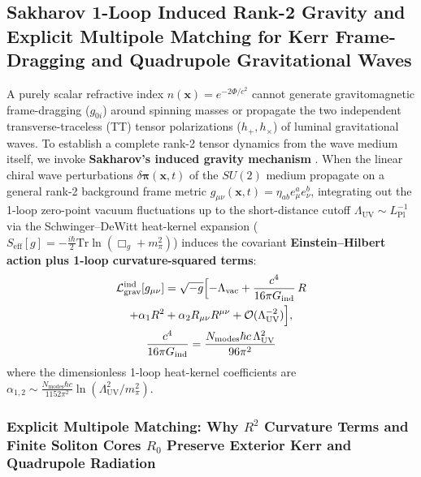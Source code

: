 \documentclass[10pt,aps,prd,twocolumn,superscriptaddress,nofootinbib,floatfix,longbibliography,showkeys]{revtex4-2}
\begin{document}
\subsection{Sakharov 1-Loop Induced Rank-2 Gravity and Explicit Multipole Matching for Kerr Frame-Dragging and Quadrupole Gravitational Waves}\label{sec:5.3}

A purely scalar refractive index $n(\mathbf{x}) = e^{-2\Phi/c^2}$ cannot generate gravitomagnetic frame-dragging ($g_{0i}$) around spinning masses or propagate the two independent transverse-traceless (TT) tensor polarizations ($h_+, h_\times$) of luminal gravitational waves. To establish a complete rank-2 tensor dynamics from the wave medium itself, we invoke \textbf{Sakharov's induced gravity mechanism} \cite{ref13,ref15,ref16}. When the linear chiral wave perturbations $\delta\boldsymbol{\pi}(\mathbf{x}, t)$ of the $SU(2)$ medium propagate on a general rank-2 background frame metric $g_{\mu\nu}(\mathbf{x}, t) = \eta_{ab} e^a_\mu e^b_\nu$, integrating out the 1-loop zero-point vacuum fluctuations up to the short-distance cutoff $\Lambda_{\text{UV}} \sim L_{\text{Pl}}^{-1}$ via the Schwinger--DeWitt heat-kernel expansion ($S_{\text{eff}}[g] = -\frac{i\hbar}{2}\text{Tr}\ln(\Box_g + m_\pi^2)$) induces the covariant \textbf{Einstein--Hilbert action plus 1-loop curvature-squared terms}:
\begin{equation}\begin{gathered}
\mathcal{L}_{\text{grav}}^{\text{ind}}[g_{\mu\nu}] = \sqrt{-g}\Bigl[ -\Lambda_{\text{vac}} + \frac{c^4}{16\pi G_{\text{ind}}}\,R \\
+ \alpha_1 R^2 + \alpha_2 R_{\mu\nu}R^{\mu\nu} + \mathcal{O}(\Lambda_{\text{UV}}^{-2}) \Bigr], \\
\frac{c^4}{16\pi G_{\text{ind}}} = \frac{N_{\text{modes}}\hbar c\,\Lambda_{\text{UV}}^2}{96\pi^2}
\end{gathered}\end{equation}
where the dimensionless 1-loop heat-kernel coefficients are $\alpha_{1,2} \sim \frac{N_{\text{modes}}\hbar c}{1152\pi^2}\ln(\Lambda_{\text{UV}}^2/m_\pi^2)$.


\subsubsection{Explicit Multipole Matching: Why $R^2$ Curvature Terms and Finite Soliton Cores $R_0$ Preserve Exterior Kerr and Quadrupole Radiation}
\end{document}
